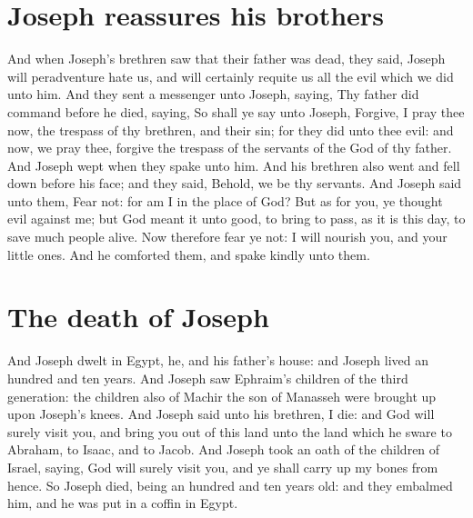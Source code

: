 \begin{biblechapter}
\section*{Joseph reassures his brothers}
\verse And when Joseph's brethren saw that their father was dead, they said, Joseph will peradventure hate us, and will certainly requite us all the evil which we did unto him.
\verse And they sent a messenger unto Joseph, saying, Thy father did command before he died, saying,
\verse So shall ye say unto Joseph, Forgive, I pray thee now, the trespass of thy brethren, and their sin; for they did unto thee evil: and now, we pray thee, forgive the trespass of the servants of the God of thy father. And Joseph wept when they spake unto him.
\verse And his brethren also went and fell down before his face; and they said, Behold, we be thy servants.
\verse And Joseph said unto them, Fear not: for am I in the place of God?
\verse But as for you, ye thought evil against me; but God meant it unto good, to bring to pass, as it is this day, to save much people alive.
\verse Now therefore fear ye not: I will nourish you, and your little ones. And he comforted them, and spake kindly unto them.
\section*{The death of Joseph}
\verse And Joseph dwelt in Egypt, he, and his father's house: and Joseph lived an hundred and ten years.
\verse And Joseph saw Ephraim's children of the third generation: the children also of Machir the son of Manasseh were brought up upon Joseph's knees.
\verse And Joseph said unto his brethren, I die: and God will surely visit you, and bring you out of this land unto the land which he sware to Abraham, to Isaac, and to Jacob.
\verse And Joseph took an oath of the children of Israel, saying, God will surely visit you, and ye shall carry up my bones from hence.
\verse So Joseph died, being an hundred and ten years old: and they embalmed him, and he was put in a coffin in Egypt.
\end{biblechapter}
